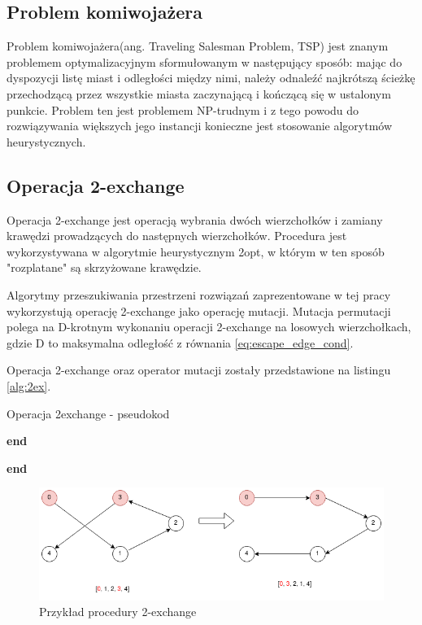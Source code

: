 \subsection{Problem komiwojażera}
Problem komiwojażera(ang. Traveling Salesman Problem, TSP) jest znanym problemem optymalizacyjnym
sformułowanym w następujący sposób: mając do dyspozycji listę miast i odległości między nimi, należy odnaleźć
najkrótszą ścieżkę przechodzącą przez wszystkie miasta zaczynającą i kończącą się w ustalonym punkcie.
Problem ten jest problemem NP-trudnym i z tego powodu do rozwiązywania większych jego instancji konieczne
jest stosowanie algorytmów heurystycznych.
\subsection{Operacja 2-exchange}
Operacja 2-exchange jest operacją wybrania dwóch wierzchołków i zamiany krawędzi prowadzących do następnych wierzchołków.
Procedura jest wykorzystywana w algorytmie heurystycznym 2opt, w którym w ten sposób "rozplatane" są skrzyżowane krawędzie.

Algorytmy przeszukiwania przestrzeni rozwiązań zaprezentowane w tej pracy wykorzystują operację 2-exchange jako operację mutacji.
Mutacja permutacji polega na D-krotnym wykonaniu operacji 2-exchange na losowych wierzchołkach, gdzie D to maksymalna odległość
z równania \ref{eq:escape_edge_cond}.

Operacja 2-exchange oraz operator mutacji zostały przedstawione na listingu \ref{alg:2ex}.

\begin{algorithm}[h!]
      \caption{Operacja 2exchange - pseudokod}\label{alg:2ex}


      \textbf{end}

      \vspace{1em}


      \textbf{end}

\end{algorithm}

\begin{figure}[h!]
      \centering
      \includegraphics[width=\textwidth]{chapters/literature/img/2exdrawio.png}
      \caption{Przykład procedury 2-exchange}
      \label{fig:2exchange}
\end{figure}






